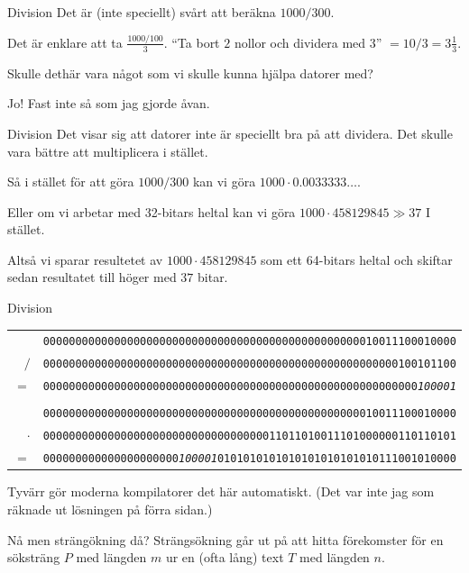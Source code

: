 \documentclass[11pt, aspectratio=169, table]{beamer}
\begin{document}
\begin{frame}{Division}
\setlength{\parskip}{\fill}
Det är (inte speciellt) svårt att beräkna $1000 / 300$.

Det är enklare att ta $\frac{1000 / 100}{3}$. ``Ta bort $2$ nollor och dividera med $3$'' $ = 10 / 3 = 3\frac{1}{3}$.

Skulle dethär vara något som vi skulle kunna hjälpa datorer med?

\pause
Jo! Fast inte så som jag gjorde åvan.
\end{frame}

\begin{frame}{Division}
\setlength{\parskip}{\fill}
Det visar sig att datorer inte är speciellt bra på att dividera. Det skulle vara bättre att multiplicera i stället.

Så i stället för att göra $1000 / 300$ kan vi göra $1000 \cdot 0.0033333\ldots$.

Eller om vi arbetar med 32-bitars heltal kan vi göra $1000 \cdot 458129845 \gg 37$ I stället.

Altså vi sparar resultetet av $1000 \cdot 458129845$ som ett 64-bitars heltal och skiftar sedan resultatet till höger med $37$ bitar.
\end{frame}

\begin{frame}[fragile]{Division}
\setlength{\parskip}{\fill}
\begin{tabular}{r c}
 & \texttt{0000000000000000000000000000000000000000000000000010011100010000} \\
$/$ & \texttt{0000000000000000000000000000000000000000000000000000000100101100} \\
\hline
$=$ & \texttt{0000000000000000000000000000000000000000000000000000000000}{\em\texttt{100001}} \\
\\
 & \texttt{0000000000000000000000000000000000000000000000000010011100010000} \\
$\cdot$ & \texttt{0000000000000000000000000000000000011011010011101000000110110101} \\
\hline
$=$ & \texttt{000000000000000000000}{\em\texttt{100001}}\texttt{0101010101010101010101010111001010000}
\end{tabular}

Tyvärr gör moderna kompilatorer det här automatiskt. (Det var inte jag som räknade ut lösningen på förra sidan.)
\end{frame}

\begin{frame}{Nå men strängökning då?}
Strängsökning går ut på att hitta förekomster för en söksträng $P$ med längden $m$ ur en (ofta lång) text $T$ med längden $n$.
\end{frame}
\end{document}
